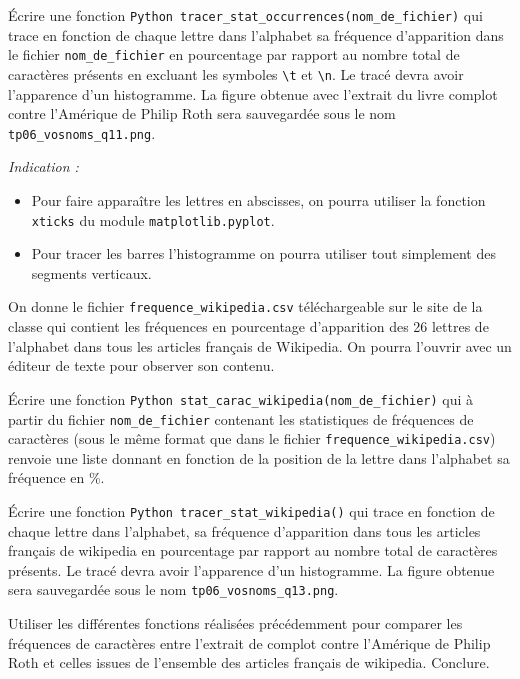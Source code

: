 \question{ } \'Ecrire une fonction \texttt{Python}\, \texttt{tracer\_stat\_occurrences(nom\_de\_fichier)} qui trace en fonction de chaque lettre dans l'alphabet sa fréquence d'apparition dans le fichier \texttt{nom\_de\_fichier} en pourcentage par rapport au nombre total de caractères présents en excluant les symboles \texttt{\textbackslash t} et \texttt{\textbackslash n}. Le tracé devra avoir l'apparence d'un histogramme. La figure obtenue avec l'extrait du livre complot contre l'Amérique de Philip Roth sera sauvegardée sous le nom \texttt{tp06\_vosnoms\_q11.png}.

\emph{Indication :}  


\begin{itemize}
\item Pour faire apparaître les lettres en abscisses, on pourra utiliser la fonction \texttt{xticks} du module \texttt{matplotlib.pyplot}.
\item Pour tracer les barres l'histogramme on pourra utiliser tout simplement des segments verticaux. 
\end{itemize}

On donne le fichier \texttt{frequence\_wikipedia.csv} téléchargeable sur le site de la classe qui contient les fréquences en pourcentage d'apparition des 26 lettres de l'alphabet dans tous les articles français de Wikipedia. On pourra l'ouvrir avec un éditeur de texte pour observer son contenu.

\question{} \'Ecrire une fonction \texttt{Python}\, \texttt{stat\_carac\_wikipedia(nom\_de\_fichier)} qui à partir du fichier \texttt{nom\_de\_fichier} contenant les statistiques de fréquences de caractères (sous le même format que dans le fichier \texttt{frequence\_wikipedia.csv}) renvoie une liste donnant en fonction de la position de la lettre dans l'alphabet sa fréquence en \%.

\question{ } \'Ecrire une fonction \texttt{Python}\, \texttt{tracer\_stat\_wikipedia()} qui trace en fonction de chaque lettre dans l'alphabet, sa fréquence d'apparition dans tous les articles français de wikipedia en pourcentage par rapport au nombre total de caractères présents. Le tracé devra avoir l'apparence d'un histogramme. La figure obtenue sera sauvegardée sous le nom \texttt{tp06\_vosnoms\_q13.png}.

\question{} Utiliser les différentes fonctions réalisées précédemment pour comparer les fréquences de caractères entre l'extrait de complot contre l'Amérique de Philip Roth et celles issues de l'ensemble des articles français de wikipedia. Conclure. 



